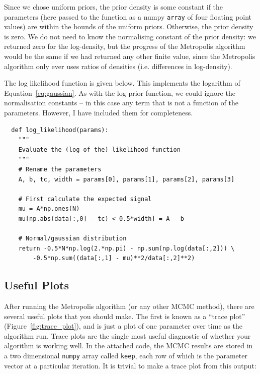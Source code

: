 Since we chose uniform priors, the prior density is some constant if the
parameters (here passed to the function as a numpy {\tt array} of four
floating point values) are within the bounds of the uniform priors. Otherwise,
the prior density is zero. We do not need to know the normalising constant
of the prior density: we returned zero for the log-density, but the progress
of the Metropolis algorithm would be the same if we had returned any other
finite value, since the Metropolis algorithm only ever uses ratios of densities
(i.e. differences in log-density).

The log likelihood function is given below. This implements the logarithm of
Equation~\ref{eq:gaussian}. As with the log prior function, we could ignore the
normalisation constants -- in this case any term that is not a function of the
parameters. However, I have included them for completeness.

\begin{verbatim}
  def log_likelihood(params):
    """
    Evaluate the (log of the) likelihood function
    """
    # Rename the parameters
    A, b, tc, width = params[0], params[1], params[2], params[3]

    # First calculate the expected signal
    mu = A*np.ones(N)
    mu[np.abs(data[:,0] - tc) < 0.5*width] = A - b

    # Normal/gaussian distribution
    return -0.5*N*np.log(2.*np.pi) - np.sum(np.log(data[:,2])) \
        -0.5*np.sum((data[:,1] - mu)**2/data[:,2]**2)
\end{verbatim}

\subsection{Useful Plots}
After running the Metropolis algorithm (or any other MCMC method), there are
several useful plots that you should make. The first is known as a
``trace plot'' (Figure~\ref{fig:trace_plot}),
and is just a plot of one parameter over time as the algorithm run. Trace plots
are the single most useful diagnostic of whether your algorithm is working well.
In the attached code, the MCMC results are stored in a two dimensional
{\tt numpy} array called {\tt keep}, each row of which is the parameter vector
at a particular iteration. It is trivial to make a trace plot from this output:

